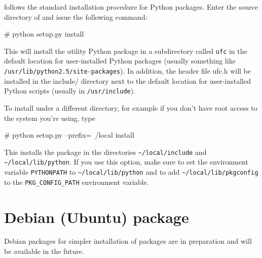 \ufc{} follows the standard installation procedure for Python
packages. Enter the source directory of \ufc{} and issue the
following command:
\begin{code}
# python setup.py install
\end{code}
This will install the \ufc{} utility Python package in a subdirectory
called \texttt{ufc} in the default location for user-installed Python
packages (usually something like \texttt{/usr/lib/python2.5/site-packages}).
In addition, the header file ufc.h will be
installed in the include/ directory next to the default location for user-installed Python scripts
(usually in \texttt{/usr/include}).

To install \ufc{} under a different directory, for example if you don't have root access to the system you're using, type
\begin{code}
# python setup.py --prefix=~/local install 
\end{code}
This installs the \ufc{} package in the directories \texttt{\~{}/local/include} and \texttt{\~{}/local/lib/python}.
If you use this option, make sure to set the environment variable \texttt{PYTHONPATH}
to \texttt{\~{}/local/lib/python} and to add \texttt{\~{}/local/lib/pkgconfig}
to the \texttt{PKG\_CONFIG\_PATH} environment variable.


\section{Debian (Ubuntu) package}

Debian packages for simpler installation of \fenics{} packages are in preparation and will be available in the future.

